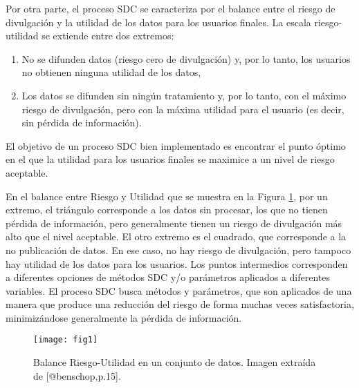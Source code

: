 \documentclass[
]{book}
\providecommand{\tightlist}{%
  \setlength{\itemsep}{0pt}\setlength{\parskip}{0pt}}
\theoremstyle{definition}
\theoremstyle{definition}
\theoremstyle{definition}
\theoremstyle{definition}
\theoremstyle{remark}
\begin{document}
Por otra parte, el proceso SDC se caracteriza por el balance entre el riesgo de divulgación y la utilidad de los datos para los usuarios finales. La escala riesgo-utilidad se extiende entre dos extremos:

\begin{enumerate}
\def\labelenumi{\roman{enumi}.}
\tightlist
\item
  No se difunden datos (riesgo cero de divulgación) y, por lo tanto, los usuarios no obtienen ninguna utilidad de los datos,
\item
  Los datos se difunden sin ningún tratamiento y, por lo tanto, con el máximo riesgo de divulgación, pero con la máxima utilidad para el usuario (es decir, sin pérdida de información).
\end{enumerate}

El objetivo de un proceso SDC bien implementado es encontrar el punto óptimo en el que la utilidad para los usuarios finales se maximice a un nivel de riesgo aceptable.

En el balance entre Riesgo y Utilidad que se muestra en la Figura \ref{fig:balance}, por un extremo, el triángulo corresponde a los datos sin procesar, los que no tienen pérdida de información, pero generalmente tienen un riesgo de divulgación más alto que el nivel aceptable. El otro extremo es el cuadrado, que corresponde a la no publicación de datos. En ese caso, no hay riesgo de divulgación, pero tampoco hay utilidad de los datos para los usuarios. Los puntos intermedios corresponden a diferentes opciones de métodos SDC y/o parámetros aplicados a diferentes variables. El proceso SDC busca métodos y parámetros, que son aplicados de una manera que produce una reducción del riesgo de forma muchas veces satisfactoria, minimizándose generalmente la pérdida de información.

\begin{figure}

{\centering \texttt{[image: fig1]} 

}

\caption{Balance Riesgo-Utilidad en un conjunto de datos. Imagen extraída de [@benschop,p.15].}\label{fig:balance}
\end{figure}
\end{document}
